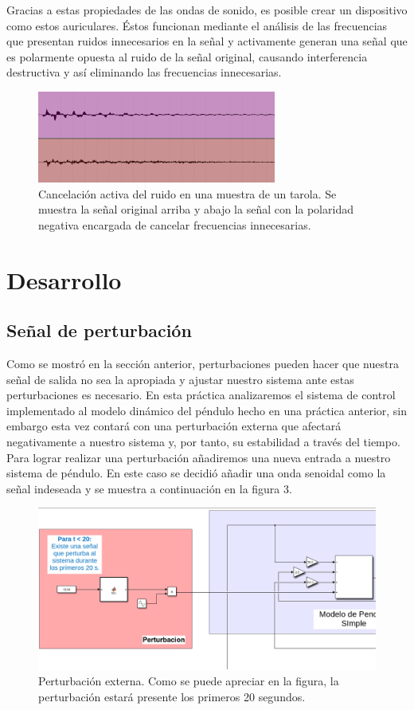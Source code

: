 \documentclass[12pt, letterpaper]{article}
\begin{document}
Gracias a estas propiedades de las ondas de sonido, es posible crear un dispositivo como estos auriculares. Éstos funcionan mediante el análisis de las frecuencias que presentan ruidos innecesarios en la señal y activamente generan una señal que es polarmente opuesta al ruido de la señal original, causando interferencia destructiva y así eliminando las frecuencias innecesarias.

\begin{figure}[H]
	\centering
	\includegraphics[width=0.7\textwidth]{noisecancel.png}
	\caption{Cancelación activa del ruido en una muestra de un tarola. Se muestra la señal original arriba y abajo la señal con la polaridad negativa encargada de cancelar frecuencias innecesarias.}
\end{figure}

\section*{Desarrollo}
\subsection*{Señal de perturbación}
Como se mostró en la sección anterior, perturbaciones pueden hacer que nuestra señal de salida no sea la apropiada y ajustar nuestro sistema ante estas perturbaciones es necesario. En esta práctica analizaremos el sistema de control implementado al modelo dinámico del péndulo hecho en una práctica anterior, sin embargo esta vez contará con una perturbación externa que afectará negativamente a nuestro sistema y, por tanto, su estabilidad a través del tiempo. Para lograr realizar una perturbación añadiremos una nueva entrada a nuestro sistema de péndulo. En este caso se decidió añadir una onda senoidal como la señal indeseada y se muestra a continuación en la figura 3.

\begin{figure}[H]
	\centering
	\includegraphics[width=\textwidth]{pert.png}
	\caption{Perturbación externa. Como se puede apreciar en la figura, la perturbación estará presente los primeros 20 segundos.}
\end{figure}
\end{document}
